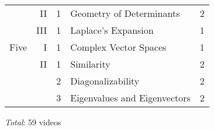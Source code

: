 \documentclass{article}
\begin{document}
\begin{center}
\begin{tabular}{|rrc|ll|}
      \cline{4-5}
      &II  &1 &Geometry of Determinants           &2   \\
      \cline{4-5}
      &III &1 &Laplace's Expansion                &1   \\
 \hline
 Five &I   &1 &Complex Vector Spaces              &1   \\
      \cline{4-5}
      &II  &1 &Similarity                         &2   \\
      &    &2 &Diagonalizability                  &2   \\
      &    &3 &Eigenvalues and Eigenvectors       &2   \\
 \hline
\end{tabular}
\end{center}
\vspace{1ex}
\textit{Total}: 59 videos
\end{document}
